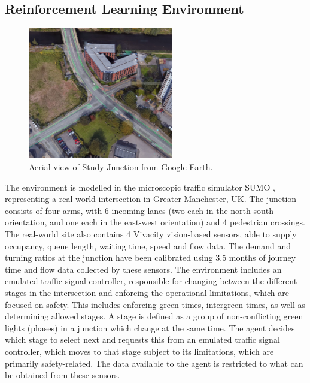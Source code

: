 \documentclass[sigconf,anonymous]{aamas}
\begin{document}
\subsection{Reinforcement Learning Environment}
\begin{figure}                                                
\centering                                                    
\includegraphics[width=2.5in]{gmaps_iso_censored.jpg}                                    
\caption{Aerial view of Study Junction from Google Earth.}                                  
\label{intersection}                                               
\end{figure}
The environment is modelled in the microscopic traffic simulator SUMO \cite{sumo}, representing a real-world intersection in Greater Manchester, UK.
The junction consists of four arms, with 6 incoming lanes (two each in the north-south orientation, and one each in the east-west orientation) and 4 pedestrian crossings.
The real-world site also contains 4 Vivacity vision-based sensors, able to supply occupancy, queue length, waiting time, speed and flow data.
The demand and turning ratios at the junction have been calibrated using 3.5 months of journey time and flow data collected by these sensors.
The environment includes an emulated traffic signal controller, responsible for changing between the different stages in the intersection and enforcing the operational limitations, which are focused on safety.
This includes enforcing green times, intergreen times, as well as determining allowed stages.  
A stage is defined as a group of non-conflicting green lights (phases) in a junction which change at the same time.
The agent decides which stage to select next and requests this from an emulated traffic signal controller, which moves to that stage subject to its limitations, which are primarily safety-related.
The data available to the agent is restricted to what can be obtained from these sensors.     
\end{document}
